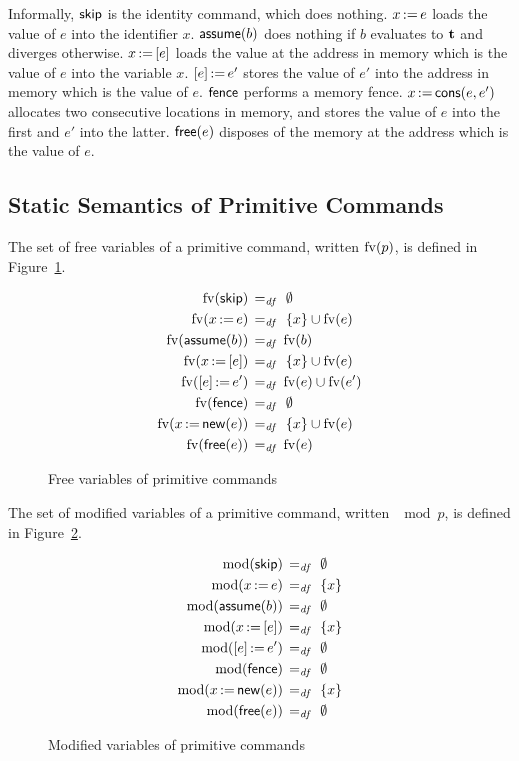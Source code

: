 \documentclass[11pt]{report}
\begin{document}
Informally, $\cskip$ is the identity command, which does nothing. $\cassign{x}{e}$ loads the value of $e$ into the identifier $x$. $\cassume{b}$ does nothing if $b$ evaluates to $\bvt$ and diverges otherwise. $\cload{x}{e}$ loads the value at the address in memory which is the value of $e$ into the variable $x$. $\cstore{e}{e'}$ stores the value of $e'$ into the address in memory which is the value of $e$. $\cfence$ performs a memory fence. $\ccons{x}{e}{e'}$ allocates two consecutive locations in memory, and stores the value of $e$ into the first and $e'$ into the latter. $\cfree{e}$ disposes of the memory at the address which is the value of $e$. 

\subsection{Static Semantics of Primitive Commands} %
\label{sub:static_semantics_of_primitive_commands}

The set of free variables of a primitive command, written $\fv{p}$, is defined in Figure~\ref{fig:fvpcomm}. 

\begin{figure}[h]
	\centering
	\begin{align*}
		\fv{\cskip} \eqdef {} & \nil \\ 
		\fv{\cassign{x}{e}} \eqdef {} & \set{x} \cup \fv{e} \\ 
		\fv{\cassume{b}} \eqdef {} & \fv{b} \\ 
		\fv{\cload{x}{e}} \eqdef {} & \set{x} \cup \fv{e} \\ 
		\fv{\cstore{e}{e'}} \eqdef {} & \fv{e} \cup \fv{e'} \\ 
		\fv{\cfence} \eqdef {} & \nil \\
		\fv{\cnew{x}{e}} \eqdef {} & \set{x} \cup \fv{e} \\ 
		\fv{\cfree{e}} \eqdef {} & \fv{e}
 	\end{align*}
	\caption{Free variables of primitive commands}
	\label{fig:fvpcomm}
\end{figure}

The set of modified variables of a primitive command, written $\mod{p}$, is defined in Figure~\ref{fig:modpcomm}. 

\begin{figure}[h]
	\centering
	\begin{align*}
		\mod{\cskip} \eqdef {} & \nil \\ 
		\mod{\cassign{x}{e}} \eqdef {} & \set{x} \\ 
		\mod{\cassume{b}} \eqdef {} & \nil \\ 
		\mod{\cload{x}{e}} \eqdef {} & \set{x} \\ 
		\mod{\cstore{e}{e'}} \eqdef {} & \nil \\ 
		\mod{\cfence} \eqdef {} & \nil \\
		\mod{\cnew{x}{e}} \eqdef {} & \set{x} \\ 
		\mod{\cfree{e}} \eqdef {} & \nil
 	\end{align*}
	\caption{Modified variables of primitive commands}
	\label{fig:modpcomm}
\end{figure}
\end{document}
